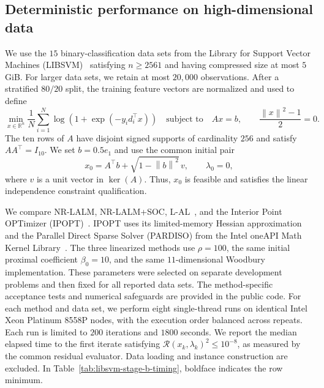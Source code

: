 \documentclass[11pt]{article}
\theoremstyle{definition}
\theoremstyle{remark}
\numberwithin{equation}{section}
\numberwithin{figure}{section}
\numberwithin{table}{section}
\numberwithin{algorithm}{section}
\newcommand{\R}{\mathbb{R}}
\newcommand{\norm}[1]{\left\lVert #1\right\rVert}
\begin{document}
\FloatBarrier
{}

\subsection{Deterministic performance on high-dimensional data}
\label{subsec:deterministic-comparison}

We use the $15$ binary-classification data sets from the Library for Support Vector Machines (LIBSVM)~\cite{ChangLin2011} satisfying $n\ge2561$ and having compressed size at most $5$ GiB.  For larger data sets, we retain at most $20{,}000$ observations.  After a stratified $80/20$ split, the training feature vectors are normalized and used to define
\begin{equation}
 \min_{x\in\R^n}
 \frac{1}{N}\sum_{i=1}^N
 \log\!\left(1+\exp(-y_i d_i^\top x)\right)
 \quad\text{subject to}\quad
 Ax=b,\qquad \frac{\norm{x}^2-1}{2}=0.
 \label{eq:libsvm-constrained-logistic}
\end{equation}
The ten rows of $A$ have disjoint signed supports of cardinality $256$ and satisfy $AA^\top=I_{10}$.  We set $b=0.5e_1$ and use the common initial pair
$$
x_0=A^\top b+\sqrt{1-\norm{b}^2}\,v,\qquad \lambda_0=0,
$$
where $v$ is a unit vector in $\ker(A)$.  Thus, $x_0$ is feasible and satisfies the linear independence constraint qualification.

We compare NR-LALM, NR-LALM+SOC, L-AL~\cite{BourkhissiNecoara2025}, and the Interior Point OPTimizer (IPOPT)~\cite{WachterBiegler2006}. IPOPT uses its limited-memory Hessian approximation and the Parallel Direct Sparse Solver (PARDISO) from the Intel oneAPI Math Kernel Library~\cite{SchenkEtAl2001}. The three linearized methods use $\rho=100$, the same initial proximal coefficient $\beta_0=10$,
and the same $11$-dimensional Woodbury implementation.  These parameters were selected on separate development problems and then fixed for all reported data sets.  The method-specific acceptance tests and numerical safeguards are provided in the public code. For each method and data set, we perform eight single-thread runs on identical Intel Xeon Platinum 8558P nodes, with the execution order balanced across repeats.  Each run is limited to $200$ iterations and $1800$ seconds.  We report the median elapsed time to the first iterate satisfying $\mathcal R(x_k,\lambda_k)^2\le10^{-8}$, as measured by the common residual
evaluator.  Data loading and instance construction are excluded.  In
Table~\ref{tab:libsvm-stage-b-timing}, boldface indicates the row minimum.
\end{document}
